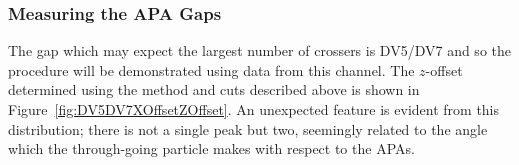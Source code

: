 \subsubsection{Measuring the APA Gaps}\label{sec:MeasuringAPAGaps}

The gap which may expect the largest number of crossers is DV5/DV7 and so the procedure will be demonstrated using data from this channel.  The $z$-offset determined using the method and cuts described above is shown in Figure~\ref{fig:DV5DV7XOffsetZOffset}.  An unexpected feature is evident from this distribution; there is not a single peak but two, seemingly related to the angle which the through-going particle makes with respect to the APAs.

